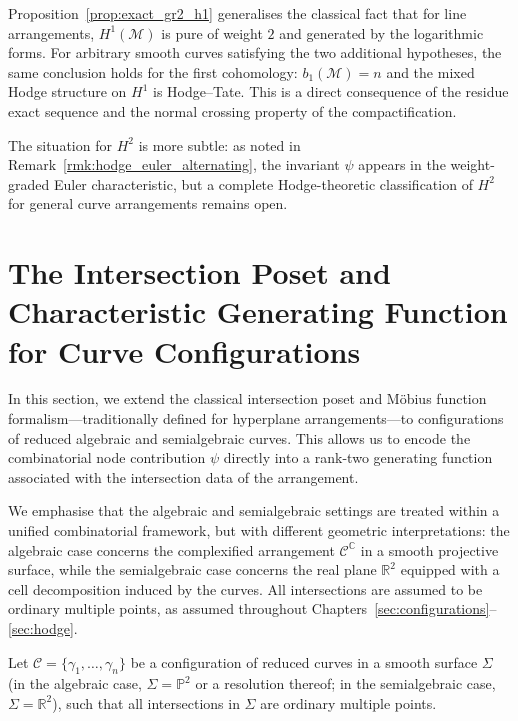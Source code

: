 \documentclass[article,11pt]{amsart} \numberwithin{equation}{section}
\numberwithin{equation}{section}
\begin{document}
{\begin{rk}
	\label{rmk:h1_hodge_tate}
	Proposition~\ref{prop:exact_gr2_h1} generalises the classical fact that for line arrangements, $H^1(\mathcal M)$ is pure of weight $2$ and generated by the logarithmic forms. For arbitrary smooth curves satisfying the two additional hypotheses, the same conclusion holds for the first cohomology: $b_1(\mathcal M)=n$ and the mixed Hodge structure on $H^1$ is Hodge--Tate. This is a direct consequence of the residue exact sequence and the normal crossing property of the compactification.
	
	The situation for $H^2$ is more subtle: as noted in Remark~\ref{rmk:hodge_euler_alternating}, the invariant $\psi$ appears in the weight-graded Euler characteristic, but a complete Hodge-theoretic classification of $H^2$ for general curve arrangements remains open.
\end{rk}




\section{The Intersection Poset and Characteristic Generating Function for Curve Configurations}
\label{sec8}

In this section, we extend the classical intersection poset and
Möbius function formalism---traditionally defined for hyperplane
arrangements---to configurations of reduced algebraic and semialgebraic
curves. This allows us to encode the combinatorial node contribution
$\psi$ directly into a rank-two generating function associated with
the intersection data of the arrangement.

We emphasise that the algebraic and semialgebraic settings are treated
within a unified combinatorial framework, but with different geometric
interpretations: the algebraic case concerns the complexified arrangement
$\mathcal{C}^{\mathbb{C}}$ in a smooth projective surface, while the
semialgebraic case concerns the real plane $\mathbb{R}^2$ equipped with
a cell decomposition induced by the curves. All intersections are assumed
to be ordinary multiple points, as assumed throughout
Chapters~\ref{sec:configurations}--\ref{sec:hodge}.

\begin{df}
	\label{df:intersection_poset}
	Let $\mathcal{C} = \{\gamma_1, \dots, \gamma_n\}$ be a configuration of
	reduced curves in a smooth surface $\Sigma$ (in the algebraic case,
	$\Sigma = \mathbb{P}^2$ or a resolution thereof; in the semialgebraic
	case, $\Sigma = \mathbb{R}^2$), such that all intersections in $\Sigma$
	are ordinary multiple points.
	

\end{df}}
\end{document}
